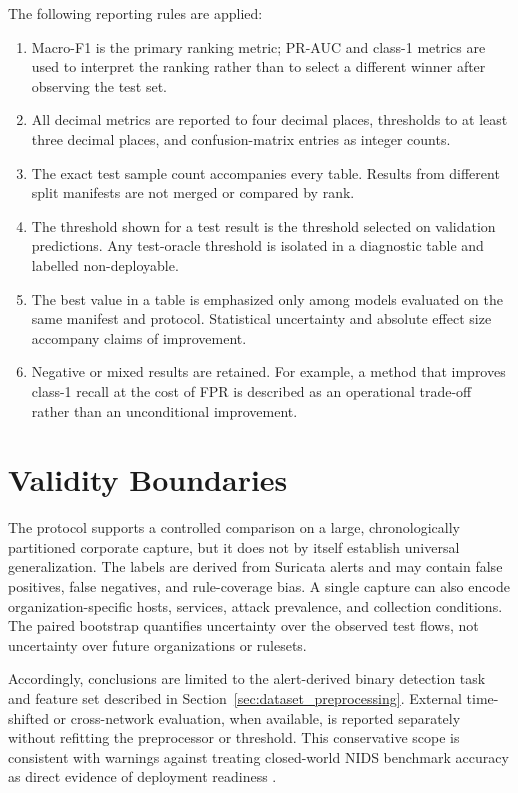 The following reporting rules are applied:
\begin{enumerate}[leftmargin=*]
    \item Macro-F1 is the primary ranking metric; PR-AUC and class-1 metrics
    are used to interpret the ranking rather than to select a different winner
    after observing the test set.
    \item All decimal metrics are reported to four decimal places, thresholds
    to at least three decimal places, and confusion-matrix entries as integer
    counts.
    \item The exact test sample count accompanies every table. Results from
    different split manifests are not merged or compared by rank.
    \item The threshold shown for a test result is the threshold selected on
    validation predictions. Any test-oracle threshold is isolated in a
    diagnostic table and labelled non-deployable.
    \item The best value in a table is emphasized only among models evaluated
    on the same manifest and protocol. Statistical uncertainty and absolute
    effect size accompany claims of improvement.
    \item Negative or mixed results are retained. For example, a method that
    improves class-1 recall at the cost of FPR is described as an operational
    trade-off rather than an unconditional improvement.
\end{enumerate}

\section{Validity Boundaries}
\label{subsec:experimental_validity}

The protocol supports a controlled comparison on a large, chronologically
partitioned corporate capture, but it does not by itself establish universal
generalization. The labels are derived from Suricata alerts and may contain
false positives, false negatives, and rule-coverage bias. A single capture can
also encode organization-specific hosts, services, attack prevalence, and
collection conditions. The paired bootstrap quantifies uncertainty over the
observed test flows, not uncertainty over future organizations or rulesets.

Accordingly, conclusions are limited to the alert-derived binary detection task
and feature set described in Section~\ref{sec:dataset_preprocessing}. External
time-shifted or cross-network evaluation, when available, is reported separately
without refitting the preprocessor or threshold. This conservative scope is
consistent with warnings against treating closed-world NIDS benchmark accuracy
as direct evidence of deployment readiness
\cite{SommerPaxson2010,Arp2022DosDonts}.

